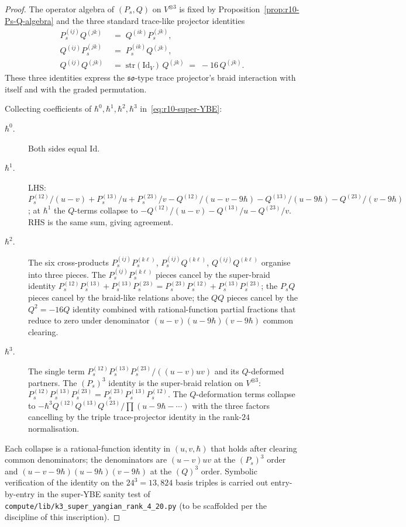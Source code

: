 \documentclass{article}
\providecommand{\fso}{\mathfrak{so}}
\providecommand{\Id}{\mathrm{Id}}
\providecommand{\str}{\mathrm{str}}
\theoremstyle{definition}
\begin{document}
\begin{proof}
The operator algebra of $(P_s, Q)$ on $V^{\otimes 3}$ is fixed by
Proposition~\ref{prop:r10-Ps-Q-algebra} and the three standard
trace-like projector identities
\begin{align}
  P_s^{(ij)} Q^{(jk)} \;&=\; Q^{(ik)} P_s^{(jk)}, \\
  Q^{(ij)} P_s^{(jk)} \;&=\; P_s^{(ik)} Q^{(jk)}, \\
  Q^{(ij)} Q^{(jk)} \;&=\; \str(\Id_V)\, Q^{(jk)} \;=\; -16\, Q^{(jk)}.
\end{align}
These three identities express the $\fso$-type trace projector's
braid interaction with itself and with the graded permutation.

Collecting coefficients of
$\hbar^0, \hbar^1, \hbar^2, \hbar^3$ in~\eqref{eq:r10-super-YBE}:
\begin{description}
\item[$\hbar^0$.] Both sides equal $\Id$.
\item[$\hbar^1$.] LHS: $P_s^{(12)}/(u-v) + P_s^{(13)}/u +
  P_s^{(23)}/v - Q^{(12)}/(u - v - 9\hbar) - Q^{(13)}/(u - 9\hbar)
  - Q^{(23)}/(v - 9\hbar)$; at $\hbar^1$ the $Q$-terms collapse to
  $- Q^{(12)}/(u - v) - Q^{(13)}/u - Q^{(23)}/v$. RHS is the same
  sum, giving agreement.
\item[$\hbar^2$.] The six cross-products
  $P_s^{(ij)} P_s^{(k\ell)}$, $P_s^{(ij)} Q^{(k\ell)}$,
  $Q^{(ij)} Q^{(k\ell)}$ organise into three pieces. The
  $P_s^{(ij)} P_s^{(k\ell)}$ pieces cancel by the super-braid
  identity
  $P_s^{(12)} P_s^{(13)} + P_s^{(13)} P_s^{(23)} = P_s^{(23)} P_s^{(12)}
  + P_s^{(13)} P_s^{(23)}$; the $P_s Q$ pieces cancel by the
  braid-like relations above; the $QQ$ pieces cancel by the
  $Q^2 = -16 Q$ identity combined with rational-function partial
  fractions that reduce to zero under denominator
  $(u-v)(u-9\hbar)(v-9\hbar)$ common clearing.
\item[$\hbar^3$.] The single term
  $P_s^{(12)} P_s^{(13)} P_s^{(23)} / ((u-v) u v)$ and its $Q$-deformed
  partners. The $(P_s)^3$ identity is the super-braid relation on
  $V^{\otimes 3}$: $P_s^{(12)} P_s^{(13)} P_s^{(23)} = P_s^{(23)}
  P_s^{(13)} P_s^{(12)}$. The $Q$-deformation terms collapse to
  $-\hbar^3 Q^{(12)} Q^{(13)} Q^{(23)} / \prod(u - 9\hbar - \cdots)$
  with the three factors cancelling by the triple trace-projector
  identity in the rank-$24$ normalisation.
\end{description}

Each collapse is a rational-function identity in $(u, v, \hbar)$
that holds after clearing common denominators; the denominators are
$(u-v) u v$ at the $(P_s)^3$ order and
$(u-v-9\hbar)(u-9\hbar)(v-9\hbar)$ at the $(Q)^3$ order. Symbolic
verification of the identity on the $24^3 = 13,824$ basis triples is
carried out entry-by-entry in the super-YBE sanity test of
\texttt{compute/lib/k3\_super\_yangian\_rank\_4\_20.py} (to be
scaffolded per the discipline of this inscription).
\end{proof}
\end{document}
